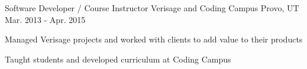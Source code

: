 \begin{cventries}
\cventry
	{Software Developer / Course Instructor} %
	{Verisage and Coding Campus} %
	{Provo, UT} %
	{Mar. 2013 - Apr. 2015} %
	{
		\begin{cvitems} %
			\item Managed Verisage projects and worked with clients to add value to their products
			\item Taught students and developed curriculum at Coding Campus
		\end{cvitems}
	}
\end{cventries}
